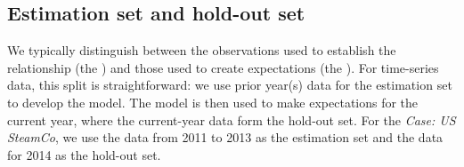 






\subsection{Estimation set and hold-out set} %
\label{sub:estimation_set_and_hold_out_set}

We typically distinguish between the observations used to establish the relationship (the ) and those used to create expectations (the ). 
For time-series data, this split is straightforward: we use prior year(s) data for the estimation set to develop the model. The model is then used to make expectations for the current year, where the current-year data form the hold-out set. For the \emph{Case: US SteamCo}, we use the data from 2011 to 2013 as the estimation set and the data for 2014 as the hold-out set.

